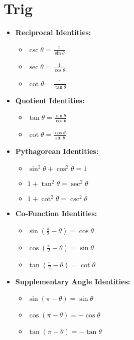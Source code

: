 \documentclass[letterpaper,12pt]{article}
\begin{document}
    \twocolumn 

    \section{Trig}
    \begin{itemize}
        \item \textbf{Reciprocal Identities:}
            \begin{itemize}
            \item $\csc \theta = \frac{1}{\sin \theta}$
            \item $\sec \theta = \frac{1}{\cos \theta}$
            \item $\cot \theta = \frac{1}{\tan \theta}$
            \end{itemize}
        
        \item \textbf{Quotient Identities:}
            \begin{itemize}
            \item $\tan \theta = \frac{\sin \theta}{\cos \theta}$
            \item $\cot \theta = \frac{\cos \theta}{\sin \theta}$
            \end{itemize}
        
        \item \textbf{Pythagorean Identities:}
            \begin{itemize}
            \item $\sin^2 \theta + \cos^2 \theta = 1$
            \item $1 + \tan^2 \theta = \sec^2 \theta$
            \item $1 + \cot^2 \theta = \csc^2 \theta$
            \end{itemize}
        
        \item \textbf{Co-Function Identities:}
            \begin{itemize}
            \item $\sin (\frac{\pi}{2} - \theta) = \cos \theta$
            \item $\cos (\frac{\pi}{2} - \theta) = \sin \theta$
            \item $\tan (\frac{\pi}{2} - \theta) = \cot \theta$
            \end{itemize}
        \item \textbf{Supplementary Angle Identities:}
            \begin{itemize}
            \item $\sin(\pi - \theta) = \sin \theta$
            \item $\cos(\pi - \theta) = -\cos \theta$
            \item $\tan(\pi - \theta) = -\tan \theta$
            \end{itemize}


\end{itemize}
\end{document}
